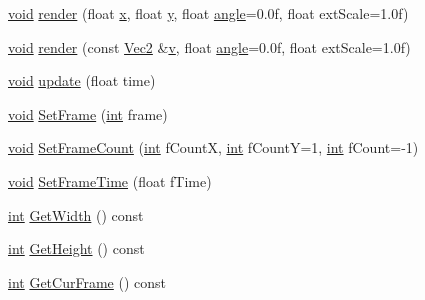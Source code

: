 \begin{DoxyCompactItemize}
\item 
\hyperlink{_s_d_l__opengles2__gl2ext_8h_ae5d8fa23ad07c48bb609509eae494c95}{void} \hyperlink{class_sprite_a01797197466499614f6d3662c9689bc9}{render} (float \hyperlink{_s_d_l__opengl_8h_ad0e63d0edcdbd3d79554076bf309fd47}{x}, float \hyperlink{_s_d_l__opengl_8h_a1675d9d7bb68e1657ff028643b4037e3}{y}, float \hyperlink{_s_d_l__opengl__glext_8h_a9e06c1f76a20fed54ca742cd25cb02c4}{angle}=0.\-0f, float ext\-Scale=1.\-0f)
\item 
\hyperlink{_s_d_l__opengles2__gl2ext_8h_ae5d8fa23ad07c48bb609509eae494c95}{void} \hyperlink{class_sprite_a73fabb950e4027366ab85761bf00d684}{render} (const \hyperlink{class_vec2}{Vec2} \&\hyperlink{_s_d_l__opengl_8h_a10a82eabcb59d2fcd74acee063775f90}{v}, float \hyperlink{_s_d_l__opengl__glext_8h_a9e06c1f76a20fed54ca742cd25cb02c4}{angle}=0.\-0f, float ext\-Scale=1.\-0f)
\item 
\hyperlink{_s_d_l__opengles2__gl2ext_8h_ae5d8fa23ad07c48bb609509eae494c95}{void} \hyperlink{class_sprite_a7234e69f8dacddac5652848606122eb1}{update} (float time)
\item 
\hyperlink{_s_d_l__opengles2__gl2ext_8h_ae5d8fa23ad07c48bb609509eae494c95}{void} \hyperlink{class_sprite_a351dd54dac6cadbbdec48f9e1d8a36c0}{Set\-Frame} (\hyperlink{_s_d_l__thread_8h_a6a64f9be4433e4de6e2f2f548cf3c08e}{int} frame)
\item 
\hyperlink{_s_d_l__opengles2__gl2ext_8h_ae5d8fa23ad07c48bb609509eae494c95}{void} \hyperlink{class_sprite_ab801fc0fe155c4d7c61ca36d9e0c5532}{Set\-Frame\-Count} (\hyperlink{_s_d_l__thread_8h_a6a64f9be4433e4de6e2f2f548cf3c08e}{int} f\-Count\-X, \hyperlink{_s_d_l__thread_8h_a6a64f9be4433e4de6e2f2f548cf3c08e}{int} f\-Count\-Y=1, \hyperlink{_s_d_l__thread_8h_a6a64f9be4433e4de6e2f2f548cf3c08e}{int} f\-Count=-\/1)
\item 
\hyperlink{_s_d_l__opengles2__gl2ext_8h_ae5d8fa23ad07c48bb609509eae494c95}{void} \hyperlink{class_sprite_aafefc524417e38d2862ea1e937e450d8}{Set\-Frame\-Time} (float f\-Time)
\item 
\hyperlink{_s_d_l__thread_8h_a6a64f9be4433e4de6e2f2f548cf3c08e}{int} \hyperlink{class_sprite_a827cd586d97dfc614761a545d3384932}{Get\-Width} () const 
\item 
\hyperlink{_s_d_l__thread_8h_a6a64f9be4433e4de6e2f2f548cf3c08e}{int} \hyperlink{class_sprite_a623bec41db2bfd09a5dec27637017929}{Get\-Height} () const 
\item 
\hyperlink{_s_d_l__thread_8h_a6a64f9be4433e4de6e2f2f548cf3c08e}{int} \hyperlink{class_sprite_ace8829016a4bff0bf0234343a30cb59b}{Get\-Cur\-Frame} () const 

\end{DoxyCompactItemize}
